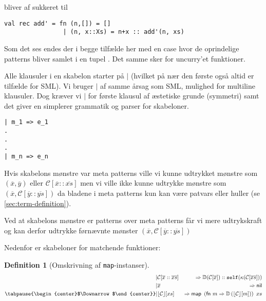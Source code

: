 \documentclass[oneside]{memoir}
\newcommand{\floor}[1]{\ensuremath{\lfloor #1 \rfloor}}
\theoremstyle{definition}
\newtheorem{definition}{Definition}
\begin{document}
bliver af sukkeret til 

\begin{verbatim}
val rec add' = fn (n,[]) = []
                | (n, x::Xs) = n+x :: add'(n, xs)
\end{verbatim}

Som det ses endes der i begge tilfælde her med en case hvor de oprindelige patterns bliver samlet
i en tupel . Det samme sker
for uncurry'et funktioner.

Alle klausuler i en skabelon starter på $|$ (hvilket på nær den første også
altid er tilfælde for SML). Vi bruger $|$ af samme årsag som SML, mulighed for
multiline klausuler. Dog kræver vi $|$ for første klausul af æstetiske grunde
(symmetri) samt det giver en simplerer grammatik og parser for
skabeloner. 

\begin{verbatim}
| m_1 => e_1
.
.
.
| m_n => e_n
\end{verbatim}

Hvis skabelons mønstre var meta patterns ville vi kunne udtrykket mønstre som
$(\overline{x}, \overline{y})$ eller $\mathcal{C}[\overline{x} ::
\overline{xs}]$ men vi ville ikke kunne udtrykke mønstre som $(\overline{x},
\mathcal{C}[\overline{y} :: \overline{ys}])$ da bladene i meta patterns kun kan
være patvars eller huller (se \ref{sec:term-definition}).

Ved at skabelons mønstre er patterns over meta patterns får vi mere udtrykskraft
og kan derfor udtrykke førnævnte mønster $(\overline{x}, \mathcal{C}[\overline{y} ::
\overline{ys}])$

Nedenfor er skabeloner for matchende funktioner:

\begin{definition}[Omskrivning af \texttt{map}-instanser] \ \\

  \begin{eqnarray*}[rqrl]
    | & \mathcal{C}  [\overline{x} :: \overline{xs}] &  => \mathbb{D}
    (\mathcal{C}[ \overline{x}]) :: \mathtt{self}(\kappa \mathsf{(} \mathcal{C} 
    [ \overline{xs} ] \mathsf{) )} \\
    | & \overline{x} & => \mathsf{nil} \\
   \tabpause{\begin{center}$\Downarrow$\end{center}}  
    | & \floor{\mathcal{C}} [ xs ] & => \textsf{map } \left( \textsf{fn } m =>
      \mathbb{D}\left( \floor{\mathcal{C}} [ m ] \right) \right) \ xs
  \end{eqnarray*}
\end{definition}
\end{document}
